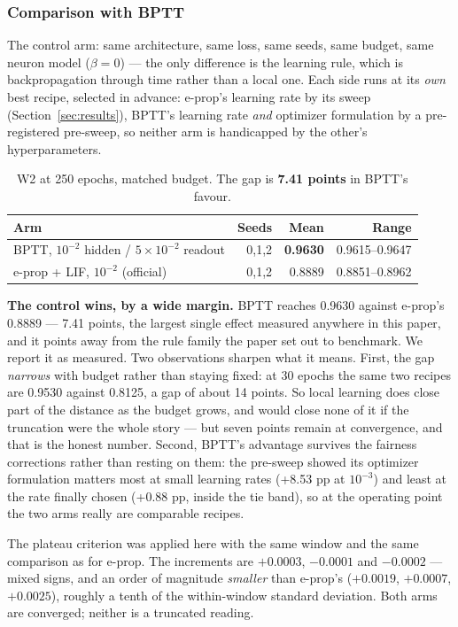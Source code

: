 \documentclass[11pt]{article}
\begin{document}
\subsubsection{Comparison with BPTT}
The control arm: same architecture, same loss, same seeds, same budget, same
neuron model ($\beta=0$) --- the only difference is the learning rule, which is
backpropagation through time rather than a local one. Each side runs at its
\emph{own} best recipe, selected in advance: e-prop's learning rate by its sweep
(Section~\ref{sec:results}), BPTT's learning rate \emph{and} optimizer
formulation by a pre-registered pre-sweep, so neither arm is handicapped by the
other's hyperparameters.

\begin{table}[h]
\centering
\begin{tabular}{lrrr}
\toprule
Arm & Seeds & Mean & Range \\
\midrule
BPTT, $10^{-2}$ hidden / $5\times10^{-2}$ readout & 0,1,2 & \textbf{0.9630} & 0.9615--0.9647 \\
e-prop + LIF, $10^{-2}$ (official) & 0,1,2 & 0.8889 & 0.8851--0.8962 \\
\bottomrule
\end{tabular}
\caption{W2 at 250 epochs, matched budget. The gap is \textbf{7.41 points} in
BPTT's favour.}
\label{tab:bptt}
\end{table}

\textbf{The control wins, by a wide margin.} BPTT reaches 0.9630 against e-prop's
0.8889 --- 7.41 points, the largest single effect measured anywhere in this
paper, and it points away from the rule family the paper set out to benchmark.
We report it as measured. Two observations sharpen what it means. First, the gap
\emph{narrows} with budget rather than staying fixed: at 30 epochs the same two
recipes are 0.9530 against 0.8125, a gap of about 14 points. So local learning
does close part of the distance as the budget grows, and would close none of it
if the truncation were the whole story --- but seven points remain at
convergence, and that is the honest number. Second, BPTT's advantage survives
the fairness corrections rather than resting on them: the pre-sweep showed its
optimizer formulation matters most at small learning rates (+8.53 pp at
$10^{-3}$) and least at the rate finally chosen (+0.88 pp, inside the tie band),
so at the operating point the two arms really are comparable recipes.

The plateau criterion was applied here with the same window and the same
comparison as for e-prop. The increments are $+0.0003$, $-0.0001$ and $-0.0002$
--- mixed signs, and an order of magnitude \emph{smaller} than e-prop's
($+0.0019$, $+0.0007$, $+0.0025$), roughly a tenth of the within-window standard
deviation. Both arms are converged; neither is a truncated reading.
\end{document}
